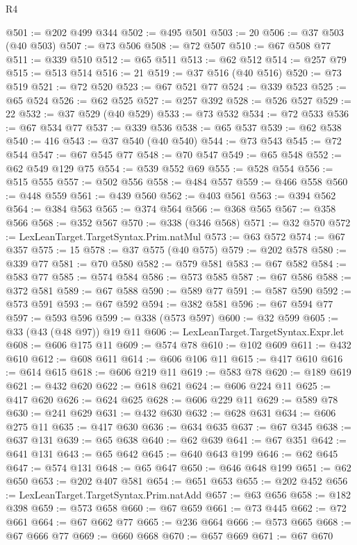 \begin{lexlean}{R4}
\begin{coremodule}
@501 := @202 @499 @344
@502 := @495 @501
@503 := 20
@506 := @37 @503 (@40 @503)
@507 := @73 @506
@508 := @72 @507
@510 := @67 @508 @77
@511 := @339 @510
@512 := @65 @511
@513 := @62 @512
@514 := @257 @79
@515 := @513 @514
@516 := 21
@519 := @37 @516 (@40 @516)
@520 := @73 @519
@521 := @72 @520
@523 := @67 @521 @77
@524 := @339 @523
@525 := @65 @524
@526 := @62 @525
@527 := @257 @392
@528 := @526 @527
@529 := 22
@532 := @37 @529 (@40 @529)
@533 := @73 @532
@534 := @72 @533
@536 := @67 @534 @77
@537 := @339 @536
@538 := @65 @537
@539 := @62 @538
@540 := 416
@543 := @37 @540 (@40 @540)
@544 := @73 @543
@545 := @72 @544
@547 := @67 @545 @77
@548 := @70 @547
@549 := @65 @548
@552 := @62 @549 @129 @75
@554 := @539 @552 @69
@555 := @528 @554
@556 := @515 @555
@557 := @502 @556
@558 := @484 @557
@559 := @466 @558
@560 := @448 @559
@561 := @439 @560
@562 := @403 @561
@563 := @394 @562
@564 := @384 @563
@565 := @374 @564
@566 := @368 @565
@567 := @358 @566
@568 := @352 @567
@570 := @338 (@346 @568)
@571 := @32 @570
@572 := LexLeanTarget.TargetSyntax.Prim.natMul
@573 := @63 @572
@574 := @67 @357
@575 := 15
@578 := @37 @575 (@40 @575)
@579 := @202 @578
@580 := @339 @77
@581 := @70 @580
@582 := @579 @581
@583 := @67 @582
@584 := @583 @77
@585 := @574 @584
@586 := @573 @585
@587 := @67 @586
@588 := @372 @581
@589 := @67 @588
@590 := @589 @77
@591 := @587 @590
@592 := @573 @591
@593 := @67 @592
@594 := @382 @581
@596 := @67 @594 @77
@597 := @593 @596
@599 := @338 (@573 @597)
@600 := @32 @599
@605 := @33 (@43 (@48 @97)) @19 @11
@606 := LexLeanTarget.TargetSyntax.Expr.let
@608 := @606 @175 @11
@609 := @574 @78
@610 := @102 @609
@611 := @432 @610
@612 := @608 @611
@614 := @606 @106 @11
@615 := @417 @610
@616 := @614 @615
@618 := @606 @219 @11
@619 := @583 @78
@620 := @189 @619
@621 := @432 @620
@622 := @618 @621
@624 := @606 @224 @11
@625 := @417 @620
@626 := @624 @625
@628 := @606 @229 @11
@629 := @589 @78
@630 := @241 @629
@631 := @432 @630
@632 := @628 @631
@634 := @606 @275 @11
@635 := @417 @630
@636 := @634 @635
@637 := @67 @345
@638 := @637 @131
@639 := @65 @638
@640 := @62 @639
@641 := @67 @351
@642 := @641 @131
@643 := @65 @642
@645 := @640 @643 @199
@646 := @62 @645
@647 := @574 @131
@648 := @65 @647
@650 := @646 @648 @199
@651 := @62 @650
@653 := @202 @407 @581
@654 := @651 @653
@655 := @202 @452
@656 := LexLeanTarget.TargetSyntax.Prim.natAdd
@657 := @63 @656
@658 := @182 @398
@659 := @573 @658
@660 := @67 @659
@661 := @73 @445
@662 := @72 @661
@664 := @67 @662 @77
@665 := @236 @664
@666 := @573 @665
@668 := @67 @666 @77
@669 := @660 @668
@670 := @657 @669
@671 := @67 @670

\end{coremodule}
\end{lexlean}
